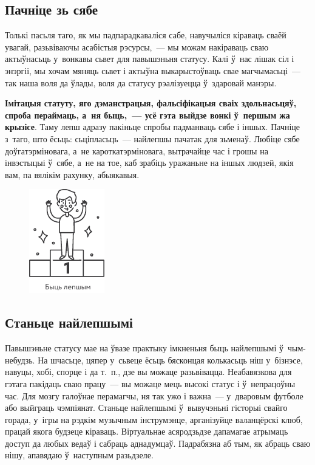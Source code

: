 \subsection*{Пачніце зь сябе}

Толькі пасьля таго, як мы падпарадкаваліся сабе, навучыліся кіраваць сваёй увагай, разьвіваючы асабістыя рэсурсы,~--- мы можам накіраваць сваю актыўнасьць у~вонкавы сьвет для павышэньня статусу. Калі ў~нас лішак сіл і энэргіі, мы хочам мяняць сьвет і актыўна выкарыстоўваць свае магчымасьці~--- так наша воля да ўлады, воля да статусу рэалізуецца ў~здаровай манэры.

\textbf{Імітацыя статуту, яго дэманстрацыя, фальсіфікацыя сваіх здольнасьцяў, спроба пераймаць, а~ня быць,~--- усё гэта выйдзе вонкі ў~першым жа крызісе}. Таму лепш адразу пакіньце спробы падманваць сябе і іншых. Пачніце з~таго, што ёсьць: сьціпласьць~--- найлепшы пачатак для зьменаў. Любіце сябе доўгатэрміновага, а~не кароткатэрміновага, вытрачайце час і грошы на інвэстыцыі ў~сябе, а~не на тое, каб зрабіць уражаньне на іншых людзей, якія вам, па вялікім рахунку, абыякавыя.

\begin{figure}[htb!]
  \centering
  \includegraphics[scale=1.5]{willpower/ch9/7.pdf}
\end{figure}

\subsection*{Станьце найлепшымі}

Павышэньне статусу мае на ўвазе практыку імкненьня быць найлепшымі ў~чым-небудзь. На шчасьце, цяпер у~сьвеце ёсьць бясконцая колькасьць ніш у~бізнэсе, навуцы, хобі, спорце і да т.~п., дзе вы можаце разьвівацца. Неабавязкова для гэтага пакідаць сваю працу~--- вы можаце мець высокі статус і ў~непрацоўны час. Для мозгу галоўнае перамагчы, ня так ужо і важна~--- у~дваровым футболе або выйграць чэмпіянат. Станьце найлепшымі ў~вывучэньні гісторыі свайго горада, у~ігры на рэдкім музычным інструмэнце, арганізуйце валанцёрскі клюб, працай якога будзеце кіраваць. Віртуальнае асяродзьдзе дапамагае атрымаць доступ да любых ведаў і сабраць аднадумцаў. Падрабязна аб тым, як абраць сваю нішу, апавядаю ў~наступным разьдзеле.

